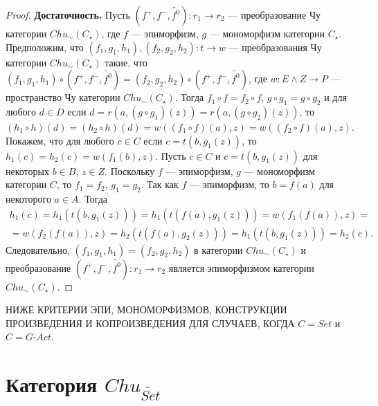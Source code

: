 \documentclass[a4paper,12pt]{article}
\newcommand{\GAct}{G\text{-}Act}
\newcommand{\fo}{\widetilde{f^0}}
\begin{document}
\begin{proof}
    \textbf{Достаточность.} Пусть $(f^+,f^-,\fo): r_1 \to r_2$ --- преобразование Чу категории $Chu_\sim(C_\star)$, где $f$ --- эпиморфизм, $g$ --- мономорфизм категории $C_{\star}$. Предположим, что $(f_1,g_1,h_1), (f_2,g_2,h_2): t \to w$ --- преобразования Чу категории $Chu_\sim(C_\star)$ такие, что $(f_1,g_1,h_1) \circ (f^+,f^-,\fo) = (f_2,g_2,h_2) \circ (f^+,f^-,\fo)$, где $w: E \wedge Z \to P$ --- пространство Чу категории $Chu_\sim(C_\star)$. Тогда $f_1 \circ f = f_2 \circ f$, $g \circ g_1 = g \circ g_2$ и для любого $d \in D$ если $d = r(a,(g \circ g_1)(z)) = r(a,(g \circ g_2)(z))$, то $(h_1 \circ h)(d) = (h_2 \circ h)(d) = w((f_1 \circ f)(a), z) = w((f_2 \circ f)(a), z)$. Покажем, что для любого $c \in C$ если $c = t(b,g_1(z))$, то $h_1(c) = h_2(c) = w(f_1(b),z)$. Пусть $c \in C$ и $c = t(b,g_1(z))$ для некоторых $b \in B$, $z \in Z$. Поскольку $f$ --- эпиморфизм, $g$ --- мономорфизм категории $C$, то $f_1 = f_2$, $g_1 = g_2$. Так как $f$ --- эпиморфизм, то $b = f(a)$ для некоторого $a \in A$. Тогда 
    \begin{multline*}
        h_1(c) = h_1(t(b,g_1(z))) = h_1(t(f(a),g_1(z))) = w(f_1(f(a)),z) =\\=
        w(f_2(f(a)),z) = h_2(t(f(a),g_2(z))) = h_1(t(b,g_1(z))) = h_2(c).
    \end{multline*}
    Следовательно, $(f_1,g_1,h_1) = (f_2,g_2,h_2)$ в категории $Chu_\sim(C_\star)$ и преобразование $(f^+,f^-,\fo): r_1 \to r_2$ является эпиморфизмом категории $Chu_\sim(C_\star)$.
\end{proof}

НИЖЕ КРИТЕРИИ ЭПИ, МОНОМОРФИЗМОВ, КОНСТРУКЦИИ ПРОИЗВЕДЕНИЯ И КОПРОИЗВЕДЕНИЯ ДЛЯ СЛУЧАЕВ, КОГДА $C = Set$ и $C = \GAct$.

\section*{Категория $Chu_{\widetilde{Set}}$}
\end{document}

